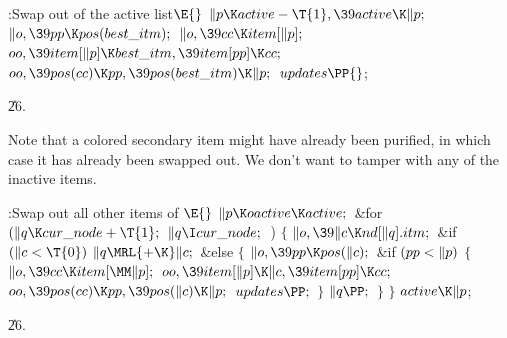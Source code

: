 \B{}:Swap  out of the active list\X${}\E{}$\6
$\|p\K\\{active}-\T{1},\39\\{active}\K\|p;{}$\6
${}\|o,\39\\{pp}\K\\{pos}(\\{best\_itm});{}$\6
${}\|o,\39\\{cc}\K\\{item}[\|p];{}$\6
${}\\{oo},\39\\{item}[\|p]\K\\{best\_itm},\39\\{item}[\\{pp}]\K\\{cc};{}$\6
${}\\{oo},\39\\{pos}(\\{cc})\K\\{pp},\39\\{pos}(\\{best\_itm})\K\|p;{}$\6
${}\\{updates}\PP{}$;\par
\U26.\fi

Note that a colored secondary item might have already been purified,
in which case it has already been swapped out. We don't want to
tamper with any of the inactive items.

\Y\B\4:Swap out all other items of \X${}\E{}$\6
$\|p\K\\{oactive}\K\\{active};{}$\6
\&{for} ${}(\|q\K\\{cur\_node}+\T{1};{}$ ${}\|q\I\\{cur\_node};{}$ \,)\5
${}\{{}$\1\6
${}\|o,\39\|c\K\\{nd}[\|q].\\{itm};{}$\6
\&{if} ${}(\|c<\T{0}){}$\1\5
${}\|q\MRL{+{\K}}\|c;{}$\2\6
\&{else}\5
${}\{{}$\1\6
${}\|o,\39\\{pp}\K\\{pos}(\|c);{}$\6
\&{if} ${}(\\{pp}<\|p){}$\5
${}\{{}$\1\6
${}\|o,\39\\{cc}\K\\{item}[\MM\|p];{}$\6
${}\\{oo},\39\\{item}[\|p]\K\|c,\39\\{item}[\\{pp}]\K\\{cc};{}$\6
${}\\{oo},\39\\{pos}(\\{cc})\K\\{pp},\39\\{pos}(\|c)\K\|p;{}$\6
${}\\{updates}\PP;{}$\6
\4${}\}{}$\2\6
${}\|q\PP;{}$\6
\4${}\}{}$\2\6
\4${}\}{}$\2\6
${}\\{active}\K\|p{}$;\par
\U26.\fi

